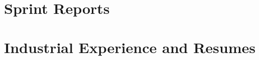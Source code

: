 \documentclass{book}
\begin{document}
\appendix

%

%

\chapter{Sprint Reports}


\chapter{Industrial Experience and Resumes}



%

\backmatter

%

%
\end{document}
